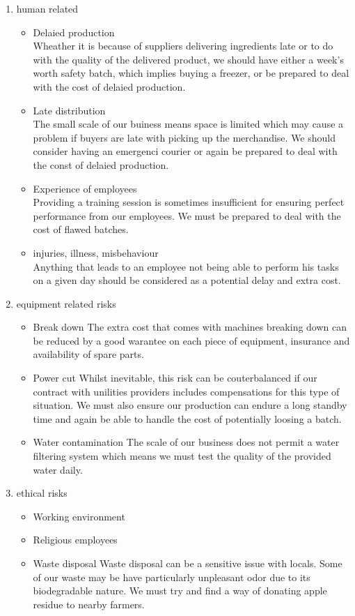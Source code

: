 \documentclass[11pt]{article}
\begin{document}
  \begin{enumerate}
  \item human related
    \begin{itemize}
    \item Delaied production \\ Wheather it is because of suppliers delivering ingredients late or to do with the quality of the delivered product, we should have either a week's worth safety batch, which implies buying a freezer, or be prepared to deal with the cost of delaied production.
    \item Late distribution \\
The small scale of our buiness means space is limited which may cause a problem if buyers are late with picking up the merchandise. We should consider having an emergenci courier  or again be prepared to deal with the const of delaied production.
    \item Experience of employees \\
Providing a training session is sometimes insufficient for ensuring perfect performance from our employees. We must be prepared to deal with the cost of flawed batches.
    \item injuries, illness, misbehaviour \\
Anything that leads to an employee not being able to perform his tasks on a given day should be considered as a potential delay and extra cost. 
    \end{itemize}

  \item equipment related risks
    \begin{itemize}
    \item Break down
The extra cost that comes with machines breaking down can be reduced by a good warantee on each piece of equipment, insurance and availability of spare parts.
    \item Power cut
Whilst inevitable, this risk can be couterbalanced if our contract with unilities providers includes compensations for this type of situation. We must also ensure our production can endure a long standby time and again be able to handle the cost of potentially loosing a batch.
    \item Water contamination
The scale of our business does not permit a water filtering system which means we must test the quality of the provided water daily.
    \end{itemize}

  \item ethical risks
    \begin{itemize}
    \item Working environment
    \item Religious employees
    \item Waste disposal
Waste disposal can be a sensitive issue with locals. Some of our waste may be have particularly unpleasant odor due to its biodegradable nature. We must try and find a way of donating apple residue to nearby farmers.
    \end{itemize}
  \end{enumerate}
\end{document}
